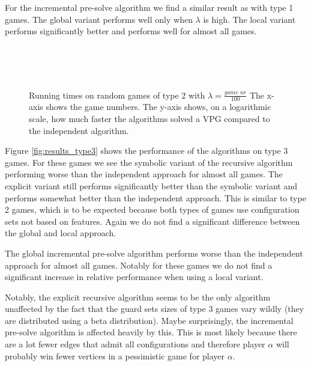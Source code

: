 For the incremental pre-solve algorithm we find a similar result as with type 1 games. The global variant performs well only when $\lambda$ is high. The local variant performs significantly better and performs well for almost all games.
\begin{figure}[H]
	\centering
	\begin{multicols}{2}
		\\
		\\
		\\
		
	\end{multicols}
	\caption{Running times on random games of type 2 with $\lambda = \frac{\textit{game nr}}{100}$ The x-axis shows the game numbers. The y-axis shows, on a logarithmic scale, how much faster the algorithms solved a VPG compared to the independent algorithm.}
	\label{fig:results_type2}
\end{figure}%

Figure \ref{fig:results_type3} shows the performance of the algorithms on type 3 games. For these games we see the symbolic variant of the recursive algorithm performing worse than the independent approach for almost all games. The explicit variant still performs significantly better than the symbolic variant and performs somewhat better than the independent approach. This is similar to type 2 games, which is to be expected because both types of games use configuration sets not based on features. Again we do not find a significant difference between the global and local approach.

The global incremental pre-solve algorithm performs worse than the independent approach for almost all games. Notably for these games we do not find a significant increase in relative performance when using a local variant.

Notably, the explicit recursive algorithm seems to be the only algorithm unaffected by the fact that the guard sets sizes of type 3 games vary wildly (they are distributed using a beta distribution). Maybe surprisingly, the incremental pre-solve algorithm is affected heavily by this. This is most likely because there are a lot fewer edges that admit all configurations and therefore player $\alpha$ will probably win fewer vertices in a pessimistic game for player $\alpha$.

